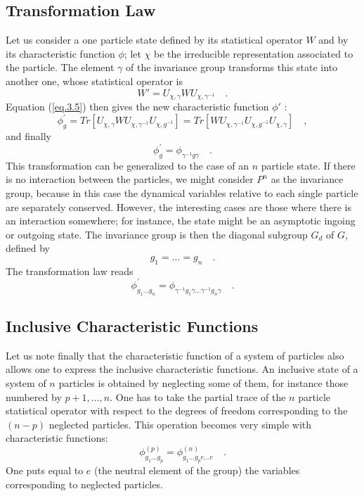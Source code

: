 \documentclass[a4paper,11pt]{article}
\newcounter{num}
\def\Uc#1{U_{\chi,{#1}}}
\begin{document}
\subsection{Transformation Law}

Let us consider a one particle state defined by its statistical operator $W$ and by its 
characteristic function $\phi$; let $\chi$ be the irreducible representation associated to the 
particle. 
The element $\gamma$ of the invariance group transforms this state into another one, whose 
statistical operator is
$$
    W' = \Uc{\gamma} W \Uc{\gamma^{-1}}   \quad .
$$
Equation (\ref{eq.3.5}) then gives  the new characteristic function $\phi'$ : 
$$
   \phi^{'}_g = Tr[\Uc{\gamma} W \Uc{\gamma^{-1}} \Uc{g^{-1}} ]
             = Tr[W \Uc{\gamma^{-1}} \Uc{g^{-1}} \Uc{\gamma} ]  \quad ,
$$
and finally
$$
   \phi^{'}_g = \phi_{\gamma^{-1} g \gamma}   \quad .
$$
This transformation can be generalized to the case of an $n$ particle state. If there is no 
interaction between the particles, we might consider $P^n$ as the invariance group, because in 
this case the dynamical variables relative to each single particle are separately conserved. 
However, the interesting cases are those where there is an interaction somewhere; for instance, 
the state might be an asymptotic ingoing or outgoing state. The invariance group is then the 
diagonal subgroup $G_d$ of $G$, defined by
$$
 g_1 = ... = g_n  \quad .
$$
The transformation law reads
\begin{equation}
 \label{eq.5.3}
    \phi^{'}_{g_1 ... g_n} = \phi_{\gamma^{-1} g_1 \gamma ... \gamma^{-1} g_n \gamma }  \quad .
\end{equation}

\subsection{Inclusive Characteristic Functions}

Let us note finally that the characteristic function of a system of particles also allows one 
to express the inclusive characteristic functions. An inclusive state of a system of $n$ 
particles is obtained by neglecting some of them, for instance those numbered by $p+1,...,n$. 
One has to take the partial trace of the $n$ particle statistical operator with respect to the 
degrees of freedom corresponding to the $(n-p)$ neglected particles. This operation becomes 
very simple with characteristic functions:
\begin{equation}
 \label{eq.5.4}
    \phi^{(p)}_{g_1 ... g_p} = \phi^{(n)}_{g_1 ... g_p e ... e}  \quad .
\end{equation}
One puts equal to $e$ (the neutral element of the group) the variables corresponding to 
neglected particles.
\end{document}
